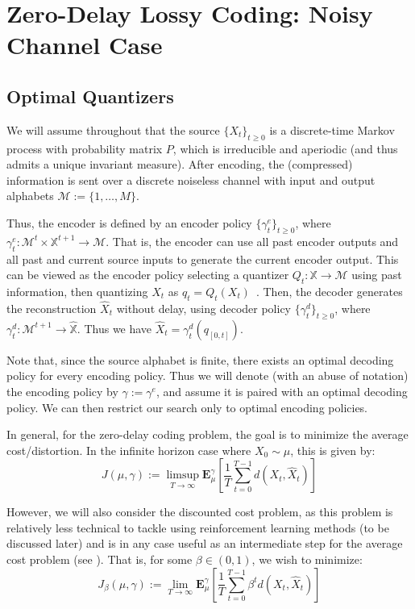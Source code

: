 \documentclass[conference]{IEEEtran}
\begin{document}
\section{Zero-Delay Lossy Coding: Noisy Channel Case}\label{section:optimal quantizers}
\subsection{Optimal Quantizers}
We will assume throughout that the source \( \{X_t\}_{t \ge 0} \) is a discrete-time Markov process with probability matrix \( P \), which is irreducible and aperiodic (and thus admits a unique invariant measure). After encoding, the (compressed) information is sent over a discrete noiseless channel with input and output alphabets \( \mathcal{M} := \{1,\ldots,M\} \).

Thus, the encoder is defined by an encoder policy \( \{\gamma^e_t\}_{t \ge 0} \), where \( \gamma^e_t : \mathcal{M}^t \times \mathbb{X}^{t+1} \to \mathcal{M} \). That is, the encoder can use all past encoder outputs and all past and current source inputs to generate the current encoder output. This can be viewed as the encoder policy selecting a quantizer \( Q_t : \mathbb{X} \to \mathcal{M} \) using past information, then quantizing \( X_t \) as \( q_t = Q_t(X_t) \)~\cite{Linder}. Then, the decoder generates the reconstruction \( \hat{X}_t \) without delay, using decoder policy \( \{\gamma^d_t\}_{t \ge 0} \), where \( \gamma^d_t : \mathcal{M}^{t+1} \to \hat{\mathbb{X}} \). Thus we have \( \hat{X}_t = \gamma^d_t(q_{[0,t]}) \).

Note that, since the source alphabet is finite, there exists an optimal decoding policy for every encoding policy. Thus we will denote (with an abuse of notation) the encoding policy by \( \gamma := \gamma^e \), and assume it is paired with an optimal decoding policy. We can then restrict our search only to optimal encoding policies.

In general, for the zero-delay coding problem, the goal is to minimize the average cost/distortion. In the infinite horizon case where \( X_0 \sim \mu \), this is given by: %
\[ J(\mu, \gamma) := \limsup_{T\to\infty}\mathbf{E}_{\mu}^{\gamma}\left[\frac{1}{T}\sum_{t=0}^{T-1}d(X_t,\hat{X}_t)\right]\label{eq:average_cost} \]

However, we will also consider the discounted cost problem, as this problem is relatively less technical to tackle using reinforcement learning methods (to be discussed later) and is in any case useful as an intermediate step for the average cost problem (see \cite{Wood}). That is, for some \( \beta \in (0,1) \), we wish to minimize:
\[ J_{\beta}(\mu, \gamma) := \lim_{T\to\infty}\mathbf{E}_{\mu}^{\gamma}\left[\frac{1}{T}\sum_{t=0}^{T-1}\beta^t d(X_t,\hat{X}_t)\right]\label{eq:discounted_cost} \]
\end{document}

